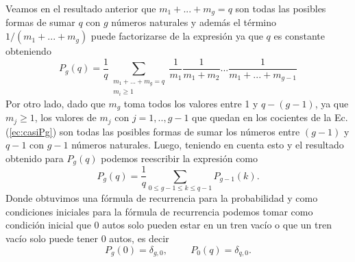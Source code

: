 \documentclass[letterpaper,12pt]{article}
\theoremstyle{plain}
\begin{document}
Veamos en el resultado anterior que $m_1 + ... + m_g = q$ son todas las posibles formas de sumar $q$ con $g$ números naturales y además el término $1/(m_1+ ... + m_g)$ puede factorizarse de la expresión ya que $q$ es constante obteniendo 
\begin{equation}
P_g (q) = \frac{1}{q} \sum_{\substack{m_1+...+m_g = q \\ m_i \geq 1}} \frac{1}{m_1} \frac{1}{m_1+m_2} ... \frac{1}{m_1+ ... + m_{g-1}}
\label{ec:casiPg}
\end{equation}
Por otro lado, dado que $m_g$ toma todos los valores entre 1 y $q - (g-1)$, ya que $m_j \geq 1$, los valores de $m_j$ con $j = 1,..,g-1$ que quedan en los cocientes de la Ec. (\ref{ec:casiPg}) son todas las posibles formas de sumar los números entre $(g-1)$ y $q-1$ con $g-1$ números naturales. Luego, teniendo en cuenta esto y el resultado obtenido para $P_g(q)$ podemos reescribir la expresión como
\begin{equation}
P_g (q) = \frac{1}{q} \sum_{0 \leq g-1 \leq k \leq q-1 } P_{g-1}(k).
\label{ec:recursion}
\end{equation}
Donde obtuvimos una fórmula de recurrencia para la probabilidad y como condiciones iniciales para la fórmula de recurrencia podemos tomar como condición inicial que 0 autos solo pueden estar en un tren vacío o que un tren vacío solo puede tener 0 autos, es decir 
\begin{equation}
P_g(0) = \delta_{g,0}, \hspace{1cm} P_0(q) = \delta_{q,0}.
\end{equation}
\end{document}
